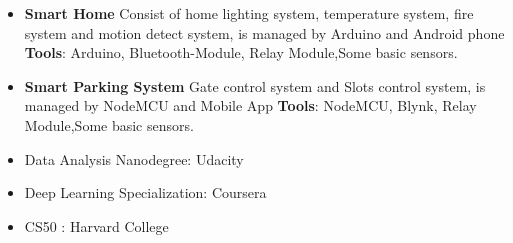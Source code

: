 \begin{itemize}
\item \textbf {Smart Home} \newline Consist of home lighting system, temperature system, fire system and motion detect system, is managed by Arduino and Android phone
\newline \textbf {Tools}: Arduino, Bluetooth-Module, Relay Module,Some basic sensors.
\smallskip
\item  \textbf {Smart Parking System} \newline Gate control system and Slots control system, is managed by NodeMCU and Mobile App 
\newline \textbf {Tools}: NodeMCU, Blynk, Relay Module,Some basic sensors.
\smallskip
\end{itemize}
\smallskip

\smallskip
\begin{itemize}
\item Data Analysis Nanodegree: Udacity 
\smallskip
\item Deep Learning Specialization: Coursera
\smallskip
\item CS50 : Harvard College
\end{itemize}
